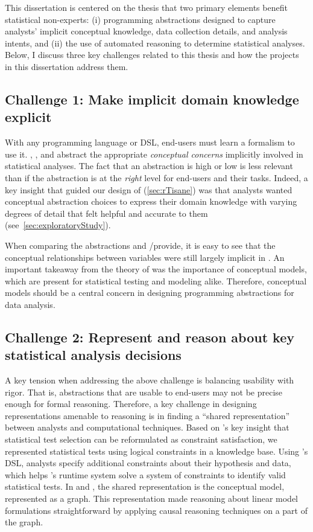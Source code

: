This dissertation is centered on the thesis that two primary elements benefit
statistical non-experts: (i) programming abstractions designed to capture
analysts' implicit conceptual knowledge, data collection details, and analysis
intents, and (ii) the use of automated reasoning to determine statistical
analyses. Below, I discuss three key challenges related to this thesis and
how the projects in this dissertation address them.

\subsection{Challenge 1: Make implicit domain knowledge explicit} 
With any programming language or DSL, end-users must learn a formalism to use
it. \tea, \tisane, and \rTisane abstract the appropriate \textit{conceptual
concerns} implicitly involved in statistical analyses. The fact that an
abstraction is high or low is less relevant than if the abstraction is at the
\textit{right} level for end-users and their tasks. Indeed, a key insight that
guided our design of \rTisane (\autoref{sec:rTisane}) was that analysts wanted
conceptual abstraction choices to express their domain knowledge
with varying degrees of detail that felt helpful and accurate to them
(see~\autoref{sec:exploratoryStudy}). %

When comparing the abstractions \tea and \tisane/\rTisane provide, it is easy to see that
the conceptual relationships between variables were still largely implicit in
\tea. An important takeaway from the theory of \hypoForm was the importance of
conceptual models, which are present for statistical testing and modeling alike.
Therefore, conceptual models should be a central concern in designing
programming abstractions for data analysis. 

\subsection{Challenge 2: Represent and reason about key statistical analysis decisions}
A key tension when addressing the above challenge is balancing usability with
rigor. That is, abstractions that are usable to end-users may not be precise
enough for formal reasoning. Therefore, a key challenge in designing
representations amenable to reasoning is in finding a ``shared
representation''~\cite{heer2019agency} between analysts and computational
techniques. Based on \tea's key insight that statistical test selection can be
reformulated as constraint satisfaction, we represented statistical
tests using logical constraints in a knowledge base. Using \tea's DSL, analysts
specify additional constraints about their hypothesis and data, which helps
\tea's runtime system solve a system of constraints to identify valid
statistical tests. In \tisane and \rTisane, the shared representation is the
conceptual model, represented as a graph. This representation made
reasoning about linear model formulations straightforward by applying causal
reasoning techniques on a part of the graph. 

